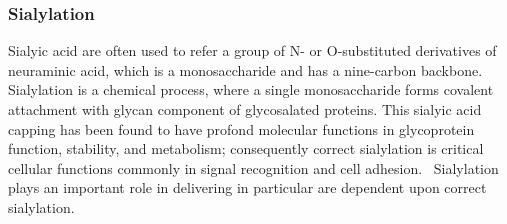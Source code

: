 \subsubsection {Sialylation}
Sialyic acid are often used to refer a group of N- or O-substituted derivatives of neuraminic acid, which is a monosaccharide and has a nine-carbon backbone.~\cite{Vocadlo_2009} Sialylation is a chemical process, where a single monosaccharide forms covalent attachment with glycan component of glycosalated proteins. This sialyic acid capping has been found to have profond molecular functions in glycoprotein function, stability, and metabolism; consequently correct sialylation is critical  cellular functions commonly in signal recognition and cell adhesion.~\cite{Bhide_2016} Sialylation plays an important role in delivering in particular are dependent upon correct sialylation.